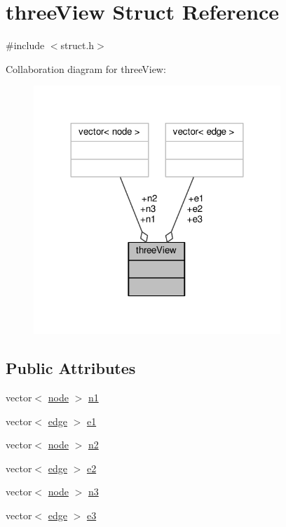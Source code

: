 \hypertarget{structthreeView}{}\section{three\+View Struct Reference}
\label{structthreeView}


{\ttfamily \#include $<$struct.\+h$>$}



Collaboration diagram for three\+View\+:
\nopagebreak
\begin{figure}[H]
\begin{center}
\leavevmode
\includegraphics[width=264pt]{structthreeView__coll__graph}
\end{center}
\end{figure}
\subsection*{Public Attributes}
\begin{DoxyCompactItemize}
\item 
vector$<$ \hyperlink{structnode}{node} $>$ \hyperlink{structthreeView_a8ac9e4dcf5da34db07c3a1847a2e16ed}{n1}
\item 
vector$<$ \hyperlink{structedge}{edge} $>$ \hyperlink{structthreeView_a2daeb560cb38121dad37eea20d81e6a0}{e1}
\item 
vector$<$ \hyperlink{structnode}{node} $>$ \hyperlink{structthreeView_a7e6db3d7b3235d0cf51c67698ac8bd9b}{n2}
\item 
vector$<$ \hyperlink{structedge}{edge} $>$ \hyperlink{structthreeView_a67b7c6877d44054bd495f5686b35b6a8}{e2}
\item 
vector$<$ \hyperlink{structnode}{node} $>$ \hyperlink{structthreeView_a3e1841e1dbd42d7b216166a3637be52d}{n3}
\item 
vector$<$ \hyperlink{structedge}{edge} $>$ \hyperlink{structthreeView_a28b42f3d940b24536915a3e2922dfcb5}{e3}
\end{DoxyCompactItemize}


